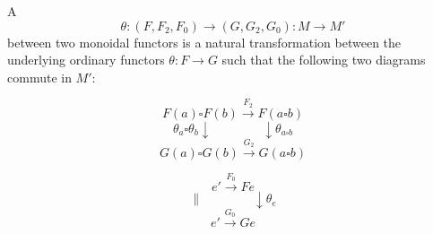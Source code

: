 A  $$\theta : (F, F_2, F_0) \rightarrow (G, G_2, G_0) : M \rightarrow M'$$ between two monoidal functors is a natural transformation between the underlying ordinary functors $\theta : F \rightarrow G$ such that the following two diagrams commute in $M'$:

$$F(a) \square F(b) \xrightarrow{F_2} F(a \square b)$$
$$\theta_a \square \theta_b \downarrow \qquad \qquad \downarrow \theta_{a \square b}$$
$$G(a) \square G(b) \xrightarrow{G_2} G(a \square b)$$

$$e' \xrightarrow{F_0} F e$$
$$\| \qquad \qquad \downarrow \theta_e$$
$$e' \xrightarrow{G_0} G e$$
